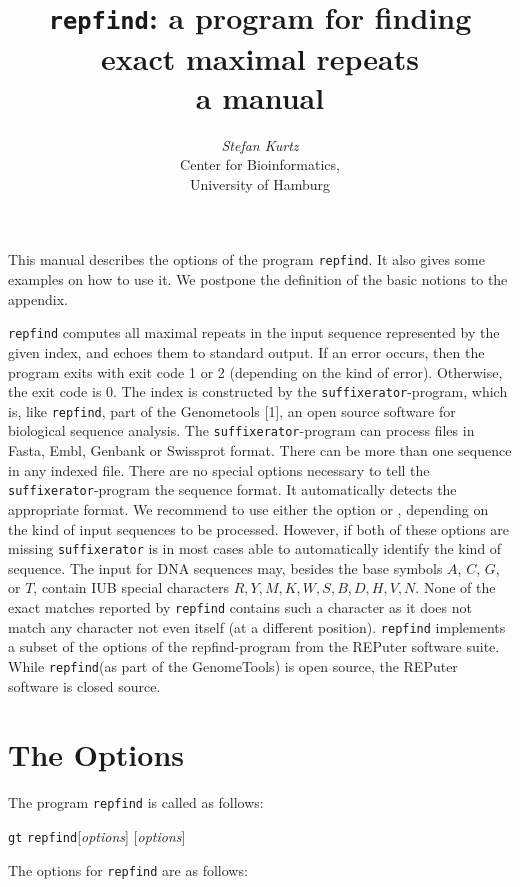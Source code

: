 \documentclass[12pt]{article}
\title{\texttt{repfind}: a program for finding exact maximal repeats\\
       a manual}
\author{\begin{tabular}{c}
         \textit{Stefan Kurtz}\\
         Center for Bioinformatics,\\
         University of Hamburg
        \end{tabular}}
\newcommand{\Repfind}[0]{\texttt{\small repfind}\xspace}
\newcommand{\Suffixerator}[0]{\texttt{\small suffixerator}\xspace}
\begin{document}
\maketitle
This manual describes the options of the program \Repfind. It also gives
some examples on how to use it. We postpone the
definition of the basic notions to the appendix.

\Repfind computes all maximal repeats in
the input sequence represented by the given index,
and echoes them to standard output.
If an error occurs, then the program exits with exit code 1 or 2 (depending on
the kind of error). Otherwise, the exit code is 0. The index is constructed
by the \Suffixerator-program, which is, like \Repfind, part of the
Genometools [1], an open source software for biological sequence analysis.
The \Suffixerator-program can process files in Fasta, Embl, Genbank or
Swissprot format. There can be more than one sequence in any
indexed file.  There are no special options necessary to tell  the
\Suffixerator-program the sequence format. It automatically detects the
appropriate format. We recommend to use either the option  or
, depending on the kind of input sequences to be processed.
However, if both of these options are missing \Suffixerator is in most
cases able to automatically identify the kind of sequence. The input for
DNA sequences may, besides the base symbols \(A\), \(C\), \(G\), or \(T\),
contain IUB special characters \(R,Y,M,K,W,S,B,D,H,V,N\). None of the
exact matches reported by \Repfind contains such a character as it
does not match any character not even itself (at a different position).
\Repfind implements a subset of the options of the repfind-program
from the REPuter software suite. While \Repfind (as part of the GenomeTools)
is open source, the REPuter software is closed source.

\section{The Options}

The program \Repfind is called as follows:
\par
\noindent\texttt{gt} \Repfind [\textit{options}] 
 [\textit{options}]

The options for \Repfind are as follows:
\end{document}
